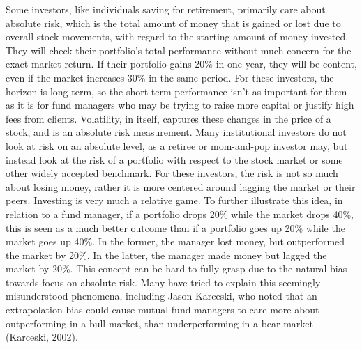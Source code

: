 \documentclass[12pt,twoside]{reedthesis}
\theoremstyle{definition}
\theoremstyle{definition}
\theoremstyle{definition}
\theoremstyle{remark}
\begin{document}
Some investors, like individuals saving for retirement, primarily care
about absolute risk, which is the total amount of money that is gained
or lost due to overall stock movements, with regard to the starting
amount of money invested. They will check their portfolio's total
performance without much concern for the exact market return. If their
portfolio gains 20\% in one year, they will be content, even if the
market increases 30\% in the same period. For these investors, the
horizon is long-term, so the short-term performance isn't as important
for them as it is for fund managers who may be trying to raise more
capital or justify high fees from clients. Volatility, in itself,
captures these changes in the price of a stock, and is an absolute risk
measurement. Many institutional investors do not look at risk on an
absolute level, as a retiree or mom-and-pop investor may, but instead
look at the risk of a portfolio with respect to the stock market or some
other widely accepted benchmark. For these investors, the risk is not so
much about losing money, rather it is more centered around lagging the
market or their peers. Investing is very much a relative game. To
further illustrate this idea, in relation to a fund manager, if a
portfolio drops 20\% while the market drops 40\%, this is seen as a much
better outcome than if a portfolio goes up 20\% while the market goes up
40\%. In the former, the manager lost money, but outperformed the market
by 20\%. In the latter, the manager made money but lagged the market by
20\%. This concept can be hard to fully grasp due to the natural bias
towards focus on absolute risk. Many have tried to explain this
seemingly misunderstood phenomena, including Jason Karceski, who noted
that an extrapolation bias could cause mutual fund managers to care more
about outperforming in a bull market, than underperforming in a bear
market (Karceski, 2002).
\end{document}
